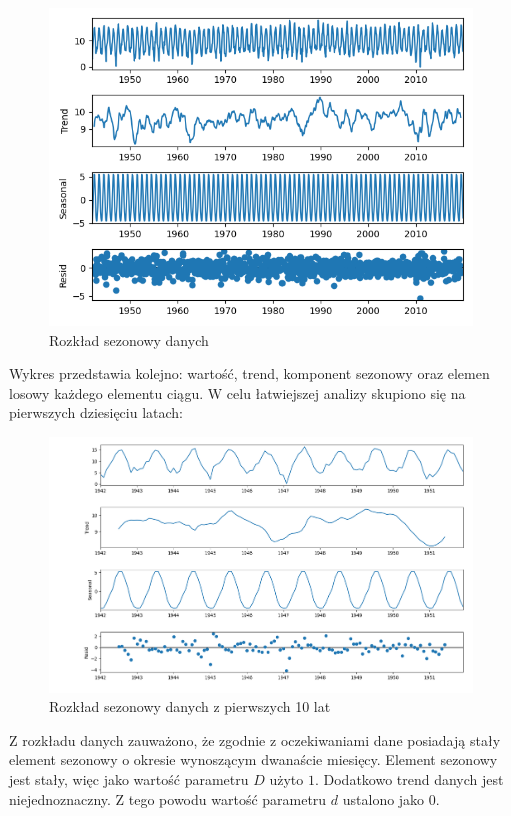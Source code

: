 \documentclass[12pt]{article}
\begin{document}
\begin{figure}[H]
    \includegraphics[width=\textwidth]{img/decomposition.png}
    \caption{Rozkład sezonowy danych}
\end{figure}

Wykres przedstawia kolejno: wartość, trend, komponent sezonowy oraz elemen losowy każdego elementu ciągu. W celu łatwiejszej analizy skupiono się na pierwszych dziesięciu latach:

\begin{figure}[H]
    \includegraphics[width=\textwidth]{img/decomposition_10y.png}
    \caption{Rozkład sezonowy danych z pierwszych 10 lat}
\end{figure}

Z rozkładu danych zauważono, że zgodnie z oczekiwaniami dane posiadają stały element sezonowy o okresie wynoszącym dwanaście miesięcy. Element sezonowy jest stały, więc jako wartość parametru $D$ użyto $1$. Dodatkowo trend danych jest niejednoznaczny. Z tego powodu wartość parametru $d$ ustalono jako $0$.
\end{document}
